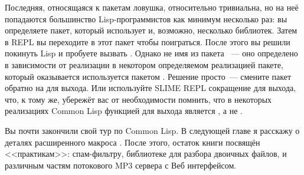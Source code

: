 Последняя, относящаяся к пакетам ловушка, относительно тривиальна, но на неё попадаются
большинство Lisp-программистов как минимум несколько раз: вы определяете пакет, который
использует  и, возможно, несколько библиотек. Затем в REPL вы переходите
в этот пакет чтобы поиграться. После этого вы решили покинуть Lisp и пробуете вызвать
. Однако  не имя из пакета ~--- оно определено в
зависимости от реализации в некотором определяемом реализацией пакете, который оказывается
используется пакетом .  Решение просто~--- смените пакет обратно на
 для выхода. Или используйте SLIME REPL сокращение для выхода, что, к тому
же, убережёт вас от необходимости помнить, что в некоторых реализациях Common Lisp
функцией для выхода является , а не .

Вы почти закончили свой тур по Common Lisp. В следующей главе я расскажу о деталях
расширенного макроса . После этого, остаток книги посвящён <<практикам>>:
спам-фильтру, библиотеке для разбора двоичных файлов, и различным частям потокового MP3
сервера с Веб интерфейсом.

